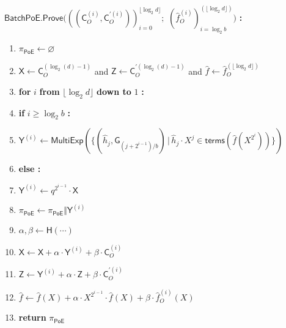 \documentclass[10pt,conference]{IEEEtran}
\theoremstyle{Definition}
\begin{document}
\begin{mdframed}
$\mathsf{BatchPoE.Prove}(((\mathsf{C}_O^{(i)}, \mathsf{C}_O^{\prime(i)}))_{i=0}^{\lfloor \log_2 d\rfloor};$ $(\hat{f}_O^{(i)})_{i = \log_2 b}^{(\lfloor \log_2 d\rfloor)})$ \textbf{:}
\begin{enumerate}[nolistsep]
	\item $\pi_{\mathsf{PoE}} \gets \varnothing$
	\item $\mathsf{X} \gets \mathsf{C}_O^{(\log_2(d)-1)}$ and $\mathsf{Z} \gets \mathsf{C}_O^{\prime(\log_2(d)-1)}$ and $\hat{f} \gets \hat{f}_O^{(\lfloor \log_2 d \rfloor)}$
	\item \textbf{for} $i$ \textbf{from} $\lfloor \log_2 d \rfloor$ \textbf{down to} $1$ \textbf{:}
	\item \pcind \textbf{if} $i \geq \log_2 b$ \textbf{:} 
	\item \pcind \pcind $\mathsf{Y}^{(i)} \gets \mathsf{MultiExp}(\{(\hat{h}_j, \mathsf{G}_{(j+2^{i-1})/b}) \, | \, \hat{h}_j \cdot X^j \in \mathsf{terms}(\hat{f}(X^{2^i})) \})$ \label{line:batchpoeprove-big}
	\item \pcind \textbf{else :}
	\item \pcind \pcind $\mathsf{Y}^{(i)} \gets q^{2^{i-1}} \cdot \mathsf{X}$ \label{line:batchpoeprove-small}
	\item \pcind $\pi_{\mathsf{PoE}} \gets \pi_{\mathsf{PoE}} \Vert \mathsf{Y}^{(i)}$
	\item \pcind $\alpha, \beta \gets \mathsf{H}(\cdots)$ 
	\item \pcind $\mathsf{X} \gets \mathsf{X} + \alpha \cdot \mathsf{Y}^{(i)} + \beta \cdot \mathsf{C}_O^{(i)}$ \label{line:batchpoeprove-regular}
	\item \pcind $\mathsf{Z} \gets \mathsf{Y}^{(i)} + \alpha \cdot \mathsf{Z} + \beta \cdot \mathsf{C}_O^{\prime(i)}$\label{line:batchpoeprove-prime}
	\item \pcind $\hat{f} \gets \hat{f}(X) + \alpha \cdot X^{2^{i-1}} \cdot \hat{f}(X) + \beta \cdot \hat{f}^{(i)}_O(X)$
	\item \textbf{return} $\pi_{\mathsf{PoE}}$
\end{enumerate}

\end{mdframed}
\end{document}
